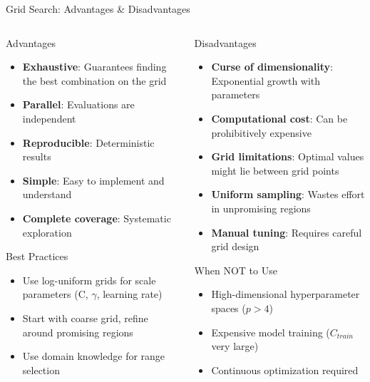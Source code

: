\documentclass[8pt,aspectratio=1610]{beamer}
\begin{document}
\begin{frame}{Grid Search: Advantages \& Disadvantages}
\begin{columns}[t]
\begin{column}{0.48\textwidth}
\begin{block}{Advantages}
\begin{itemize}
\setlength{\itemsep}{3pt}
\item \textbf{Exhaustive}: Guarantees finding the best combination on the grid
\item \textbf{Parallel}: Evaluations are independent
\item \textbf{Reproducible}: Deterministic results
\item \textbf{Simple}: Easy to implement and understand
\item \textbf{Complete coverage}: Systematic exploration
\end{itemize}
\end{block}

\begin{block}{Best Practices}
\begin{itemize}
\setlength{\itemsep}{2pt}
\item Use log-uniform grids for scale parameters (C, $\gamma$, learning rate)
\item Start with coarse grid, refine around promising regions
\item Use domain knowledge for range selection
\end{itemize}
\end{block}
\end{column}

\begin{column}{0.48\textwidth}
\begin{block}{Disadvantages}
\begin{itemize}
\setlength{\itemsep}{3pt}
\item \textbf{Curse of dimensionality}: Exponential growth with parameters
\item \textbf{Computational cost}: Can be prohibitively expensive
\item \textbf{Grid limitations}: Optimal values might lie between grid points
\item \textbf{Uniform sampling}: Wastes effort in unpromising regions
\item \textbf{Manual tuning}: Requires careful grid design
\end{itemize}
\end{block}

\begin{block}{When NOT to Use}
\begin{itemize}
\setlength{\itemsep}{2pt}
\item High-dimensional hyperparameter spaces ($p > 4$)
\item Expensive model training ($C_{train}$ very large)
\item Continuous optimization required
\end{itemize}
\end{block}
\end{column}
\end{columns}


\end{frame}
\end{document}
